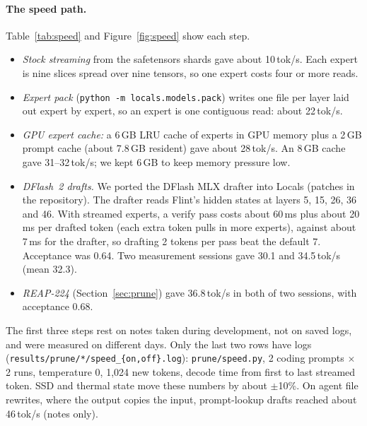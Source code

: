 \documentclass[11pt]{article}
\newcommand{\tps}{tok/s}
\begin{document}
\paragraph{The speed path.} Table~\ref{tab:speed} and Figure~\ref{fig:speed} show each step.
\begin{itemize}
  \item \emph{Stock streaming} from the safetensors shards gave about 10\,\tps{}. Each expert is nine slices spread over
        nine tensors, so one expert costs four or more reads.
  \item \emph{Expert pack} (\texttt{python -m locals.models.pack}) writes one file per layer laid out expert by expert,
        so an expert is one contiguous read: about 22\,\tps{}.
  \item \emph{GPU expert cache:} a 6\,GB LRU cache of experts in GPU memory plus a 2\,GB prompt cache (about 7.8\,GB
        resident) gave about 28\,\tps{}. An 8\,GB cache gave 31--32\,\tps{}; we kept 6\,GB to keep memory pressure low.
  \item \emph{DFlash~2 drafts.} We ported the DFlash MLX drafter into Locals (patches in the repository). The drafter
        reads Flint's hidden states at layers 5, 15, 26, 36 and 46. With streamed experts, a verify pass costs about
        60\,ms plus about 20\,ms per drafted token (each extra token pulls in more experts), against about 7\,ms for the
        drafter, so drafting 2 tokens per pass beat the default 7. Acceptance was 0.64. Two measurement sessions gave
        30.1 and 34.5\,\tps{} (mean 32.3).
  \item \emph{REAP-224} (Section~\ref{sec:prune}) gave 36.8\,\tps{} in both of two sessions, with acceptance 0.68.
\end{itemize}

The first three steps rest on notes taken during development, not on saved logs, and were measured on different days.
Only the last two rows have logs (\texttt{results/prune/*/speed\_\{on,off\}.log}): \texttt{prune/speed.py}, 2 coding
prompts $\times$ 2 runs, temperature 0, 1,024 new tokens, decode time from first to last streamed token. SSD and thermal
state move these numbers by about $\pm$10\%. On agent file rewrites, where the output copies the input, prompt-lookup
drafts reached about 46\,\tps{} (notes only).
\end{document}
